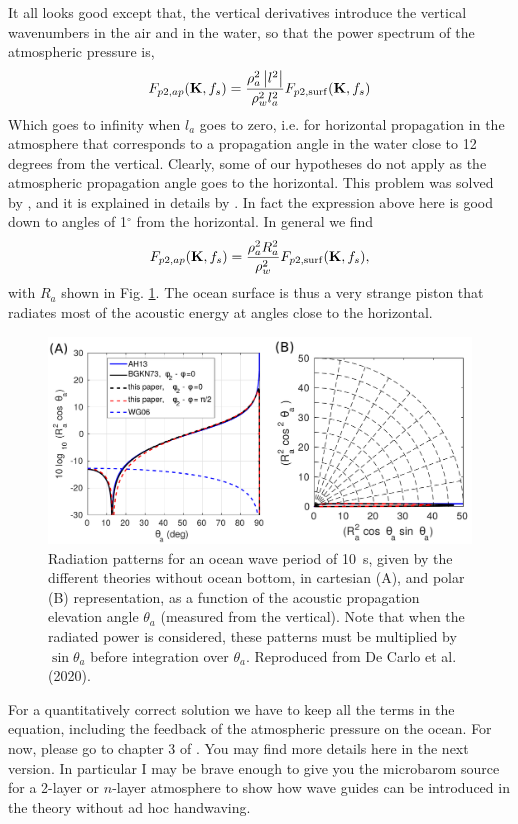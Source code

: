 It all looks good except that, the vertical derivatives introduce the vertical wavenumbers in the air and in the water, so that the power spectrum of the atmospheric pressure is, 
\begin{equation}
F_{p2,ap}(\mathbf{K},f_s)= \frac{\rho_a^2 \left|l^2\right|}{\rho_w^2 l_a^2 } 
F_{p2,\mathrm{surf}}(\mathbf{K} ,f_s)
\end{equation}
Which goes to infinity when $l_a$ goes to zero, i.e. for horizontal propagation in the atmosphere that corresponds to a propagation angle in the water close to 12 degrees from the vertical. Clearly, some of our hypotheses do not apply as the atmospheric propagation angle goes to the horizontal. This problem was solved by \cite{Brekhovskikh&al.1973}, and it is explained in details by \cite{DeCarlo2020}. In fact the expression above here is good down to angles of 1$^\circ$ from the horizontal. In general we find 
\begin{equation}
F_{p2,ap}(\mathbf{K},f_s)= \frac{\rho_a^2 R_a^2}{\rho_w^2 } 
F_{p2,\mathrm{surf}}(\mathbf{K} ,f_s),
\end{equation}
with $R_a$ shown in Fig. \ref{fig:rad_deep}.
The ocean surface is thus a very strange piston that radiates most of the acoustic energy at angles close to the horizontal.
\begin{figure}[htb]
\centering
\includegraphics[width=0.8\linewidth]{FIGS_CH_BAROMS/radiation_deep.pdf}
\caption{Radiation patterns for an ocean wave period of 10~s, given by the different theories without ocean bottom, in cartesian (A), and polar (B) representation, as a function of the acoustic propagation elevation angle $\theta_a$ (measured from the vertical). Note that when the radiated power is considered, these patterns must be multiplied by $\sin \theta_a$ before integration over $\theta_a$. Reproduced from De Carlo et al. (2020). %
  }
\label{fig:rad_deep}
\end{figure}

For a quantitatively correct solution we have to keep all the terms in the equation, including the feedback of the atmospheric pressure on the ocean.
For now, please go to chapter 3 of \cite{DeCarlo2020}. You may find more details here in the next version. In particular I may be brave enough to give you the microbarom source for a 2-layer or $n$-layer atmosphere to show how wave guides can be introduced in the theory without ad hoc handwaving. 



